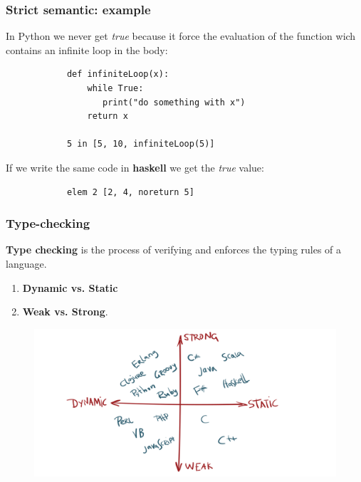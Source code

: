 \documentclass[xcolor ={table,usenames,dvipsnames}]{beamer}
\theoremstyle{definition}
\begin{document}
	\begin{frame}[fragile]
		\frametitle{Strict semantic: example}
		In Python we never get \textit{true} because  it force the evaluation of the function wich contains an infinite loop in the body:
		\begin{lstlisting}
			def infiniteLoop(x):
			    while True:
		           print("do something with x")
		        return x
				
			5 in [5, 10, infiniteLoop(5)]
		\end{lstlisting}
		If we write the same code in \textbf{haskell} we get the \textit{true} value:
		\begin{lstlisting}
			elem 2 [2, 4, noreturn 5]
		\end{lstlisting}
	\end{frame}

	\begin{frame}
		\frametitle{Type-checking }
			\textbf{Type checking} is the process of verifying and enforces the typing rules of a language.
		\begin{enumerate}
			\item \textbf{Dynamic vs. Static}
			\item \textbf{Weak vs. Strong}.
		\end{enumerate}
		\begin{figure}[h!]
			\centering
			\includegraphics[scale=0.14]{img/classification.png}
		\end{figure}
	\end{frame}
\end{document}
